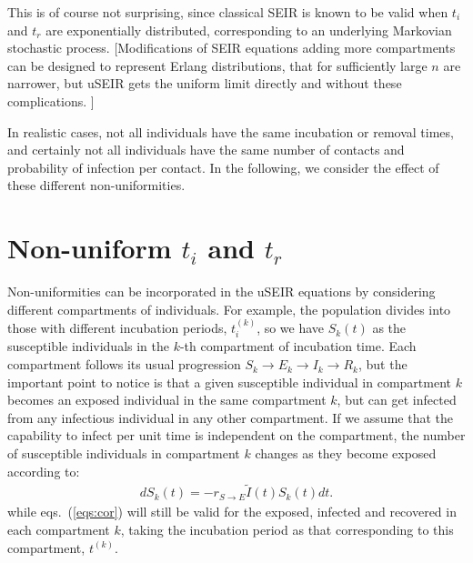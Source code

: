 \documentclass[a4paper,oneside,11pt]{article}
\newcommand{\mycomment}[1]{\textcolor[rgb]{0.75,0,0}{[#1]}}
\begin{document}
  This is of course not surprising, since classical SEIR is known to be valid when  $t_i$ and $t_r$
are exponentially distributed, corresponding to an underlying Markovian stochastic process. \mycomment{Modifications of SEIR equations adding more compartments can be designed to represent  Erlang distributions,  that for sufficiently large $n$  are narrower, but uSEIR gets the uniform limit directly and without these complications. }

In  realistic cases, not all individuals have the same incubation or removal times, and certainly not all individuals have the same number of contacts and probability of infection per contact. In the following, we consider the effect of these different non-uniformities.

\section{Non-uniform $t_i$ and $t_r$ }
\label{sec:titr}

Non-uniformities can be incorporated in the uSEIR equations by considering different compartments of individuals. For example, the population divides   into those with different incubation periods, $t_i^{(k)}$, so we have $S_k(t)$ as the susceptible individuals in the $k$-th compartment of incubation time. Each compartment follows its usual progression $S_k\rightarrow E_k \rightarrow I_k \rightarrow R_k$, but the important point to notice is that a given susceptible individual in compartment $k$ becomes an exposed individual in the same compartment $k$, but can get infected from any infectious individual in any other compartment. If we assume that the capability to infect per unit time is independent on the compartment, the number of susceptible individuals in compartment $k$ changes as they become exposed according to:
\begin{eqnarray}
d S_k(t) = - r_{S\rightarrow E} \tilde{I}(t) S_k(t) dt.
\end{eqnarray}
while eqs.~(\ref{eqs:cor}) will still be valid for the exposed, infected and recovered in each compartment $k$, taking the incubation period as that corresponding to this compartment, $t^{(k)}$.
\end{document}

